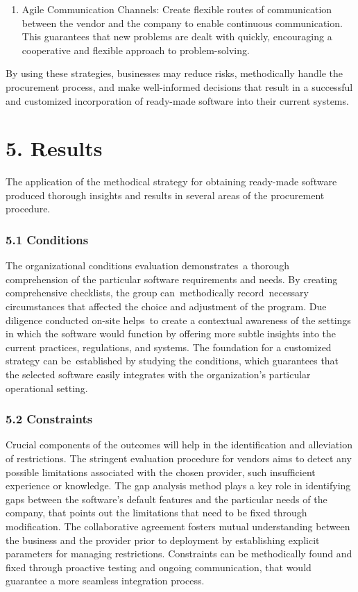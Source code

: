 \documentclass[letterpaper, 11pt]{report}
\begin{document}
{\begin{enumerate}
    \item Agile Communication Channels: Create flexible routes of communication between the vendor and the company to enable continuous communication. This guarantees that new problems are dealt with quickly, encouraging a cooperative and flexible approach to problem-solving.
\end{enumerate}
\normalsize{
By using these strategies, businesses may reduce risks, methodically handle the procurement process, and make well-informed decisions that result in a successful and customized incorporation of ready-made software into their current systems.
}

\newpage
{}
\section*{5. Results}
\normalsize{The application of the methodical strategy for obtaining ready-made software produced thorough insights and results in several areas of the procurement procedure.
}
\subsubsection*{5.1 Conditions}
\normalsize{The organizational conditions evaluation demonstrates a thorough comprehension of the particular software requirements and needs. By creating comprehensive checklists, the group can methodically record necessary circumstances that affected the choice and adjustment of the program. Due diligence conducted on-site helps to create a contextual awareness of the settings in which the software would function by offering more subtle insights into the current practices, regulations, and systems. The foundation for a customized strategy can be established by studying the conditions, which guarantees that the selected software easily integrates with the organization's particular operational setting.
}

\subsubsection*{5.2 Constraints}
\normalsize{Crucial components of the outcomes will help in the identification and alleviation of restrictions. The stringent evaluation procedure for vendors aims to detect any possible limitations associated with the chosen provider, such insufficient experience or knowledge. The gap analysis method plays a key role in identifying gaps between the software's default features and the particular needs of the company, that points out the limitations that need to be fixed through modification. The collaborative agreement fosters mutual understanding between the business and the provider prior to deployment by establishing explicit parameters for managing restrictions. Constraints can be methodically found and fixed through proactive testing and ongoing communication, that would guarantee a more seamless integration process.
}

}
\end{document}
